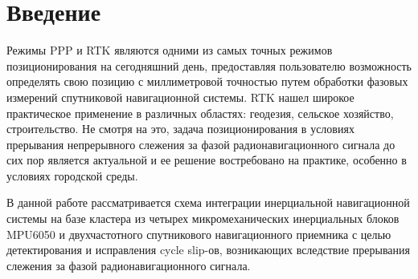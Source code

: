 \section {Введение}


Режимы PPP и RTK являются одними из самых точных режимов позиционирования на сегодняшний день, предоставляя пользователю возможность
определять свою позицию с миллиметровой точностью путем обработки фазовых измерений спутниковой навигационной системы. 
RTK нашел широкое практическое применение в различных областях: геодезия, сельское хозяйство, строительство. Не смотря на это, задача 
позиционирования в условиях прерывания непрерывного слежения за фазой радионавигационного сигнала до сих пор является актуальной и ее 
решение востребовано на практике, особенно в условиях городской среды. 


В данной работе рассматривается схема интеграции инерциальной навигационной системы на базе кластера
из четырех микромеханических инерциальных блоков MPU6050 и двухчастотного спутникового навигационного приемника с целью детектирования и 
исправления cycle slip-ов, возникающих вследствие прерывания слежения за фазой радионавигационного сигнала. 
 